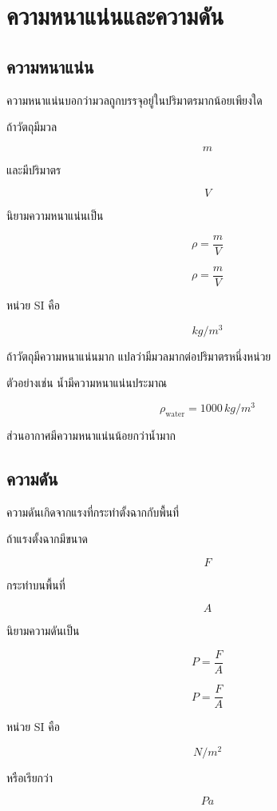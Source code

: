\newpage{}

\section{ความหนาแน่นและความดัน}

\subsection{ความหนาแน่น}

ความหนาแน่นบอกว่ามวลถูกบรรจุอยู่ในปริมาตรมากน้อยเพียงใด

ถ้าวัตถุมีมวล

\[
m
\]

และมีปริมาตร

\[
V
\]

นิยามความหนาแน่นเป็น

\[
\rho=\frac{m}{V}
\]

\begin{tcolorbox}[title=นิยามความหนาแน่น]
\[
\rho=\frac{m}{V}
\]

หน่วย SI คือ

\[
\si{kg/m^3}
\]
\end{tcolorbox}

ถ้าวัตถุมีความหนาแน่นมาก แปลว่ามีมวลมากต่อปริมาตรหนึ่งหน่วย

ตัวอย่างเช่น น้ำมีความหนาแน่นประมาณ

\[
\rho_{\text{water}}=1000\,\si{kg/m^3}
\]

ส่วนอากาศมีความหนาแน่นน้อยกว่าน้ำมาก

\subsection{ความดัน}

ความดันเกิดจากแรงที่กระทำตั้งฉากกับพื้นที่

ถ้าแรงตั้งฉากมีขนาด

\[
F
\]

กระทำบนพื้นที่

\[
A
\]

นิยามความดันเป็น

\[
P=\frac{F}{A}
\]

\begin{tcolorbox}[title=นิยามความดัน]
\[
P=\frac{F}{A}
\]

หน่วย SI คือ

\[
\si{N/m^2}
\]

หรือเรียกว่า

\[
\si{Pa}
\]
\end{tcolorbox}

